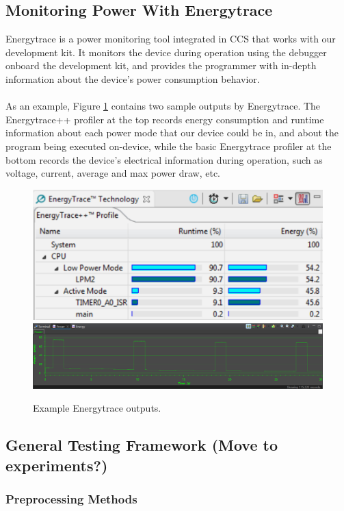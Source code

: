 \documentclass[twoside]{report}
\begin{document}
\subsection{Monitoring Power With Energytrace}
Energytrace is a power monitoring tool integrated in CCS that works with our development kit. 
It monitors the device during operation using the debugger onboard the development kit, 
and provides the programmer with in-depth information about the device's power consumption behavior.\\\\
As an example, Figure \ref{fig:traces} contains two sample outputs by Energytrace. 
The Energytrace++ profiler at the top records energy consumption and runtime information 
about each power mode that our device could be in, and about the program being executed on-device, 
while the basic Energytrace profiler at the bottom records the device's electrical information 
during operation, such as voltage, current, average and max power draw, etc.
\begin{figure}[ht]
    \centering
    \includegraphics[width=0.8\linewidth]{method/trace2.png}
    \includegraphics[width=0.8\linewidth]{method/trace.PNG}
    \caption{Example Energytrace outputs.}
    \label{fig:traces}
\end{figure}

\subsection{General Testing Framework (Move to experiments?)}
\subsubsection{Preprocessing Methods}
\end{document}
